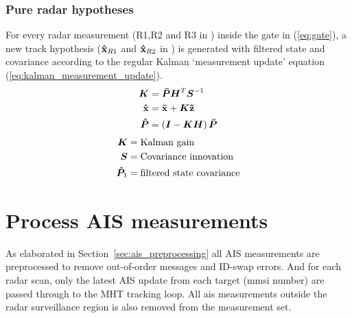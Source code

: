 \subsubsection{Pure radar hypotheses}
For every radar measurement (R1,R2 and R3 in ) inside the gate in (\ref{eq:gate}), a new track hypothesis (\(\boldsymbol{\mathbf{\hat{x}}}_{R1}\) and \(\boldsymbol{\mathbf{\hat{x}}}_{R2}\) in ) is generated with filtered state and covariance according to the regular Kalman `measurement update' equation (\ref{eq:kalman_measurement_update}).
\begin{equation}\label{eq:kalman_measurement_update}
\begin{split}
\bm{K} 	&= \bm{\bar{P}} \bm{H}^T \bm{S}^{-1} \\
\boldsymbol{\mathbf{\hat{x}}} &= \boldsymbol{\mathbf{\bar{x}}} + \bm{K} \boldsymbol{\mathbf{\tilde{z}}} \\
\bm{\hat{P}} &= \left(\bm{I} - \bm{K} \bm{H} \right) \bm{\bar{P}} \\
\end{split}
\end{equation}
\begin{equation*}
\begin{split}
\bm{K}			&= \text{Kalman gain} \\
\bm{S}			&= \text{Covariance innovation} \\
\bm{\hat{P}}_1 	&= \text{filtered state covariance} \\
\end{split}
\end{equation*}

\section{Process AIS measurements}\label{sec:process_ais_measurements}
As elaborated in Section~\ref{sec:ais_preprocessing} all AIS measurements are preprocessed to remove out-of-order messages and ID-swap errors. And for each radar scan, only the latest AIS update from each target (\gls{mmsi} number) are passed through to the MHT tracking loop. All \gls{ais} measurements outside the radar surveillance region is also removed from the measurement set. 

